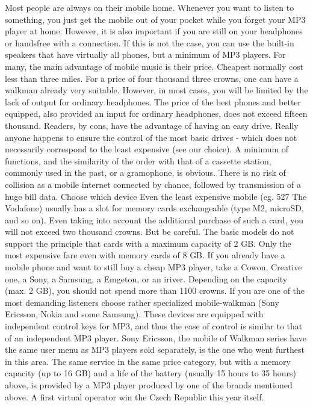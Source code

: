 Most people are always on their mobile home.
Whenever you want to listen to something, you just get the mobile out of your pocket while you forget your MP3 player at home.
However, it is also important if you are still on your headphones or handsfree with a connection.
If this is not the case, you can use the built-in speakers that have virtually all phones, but a minimum of MP3 players.
For many, the main advantage of mobile music is their price.
Cheapest normally cost less than three miles.
For a price of four thousand three crowns, one can have a walkman already very suitable.
However, in most cases, you will be limited by the lack of output for ordinary headphones.
The price of the best phones and better equipped, also provided an input for ordinary headphones, does not exceed fifteen thousand.
Readers, by cons, have the advantage of having an easy drive.
Really anyone happens to ensure the control of the most basic drives - which does not necessarily correspond to the least expensive (see our choice).
A minimum of functions, and the similarity of the order with that of a cassette station, commonly used in the past, or a gramophone, is obvious.
There is no risk of collision as a mobile internet connected by chance, followed by transmission of a huge bill data.
Choose which device
Even the least expensive mobile (eg. 527 The Vodafone) usually has a slot for memory cards exchangeable (type M2, microSD, and so on).
Even taking into account the additional purchase of such a card, you will not exceed two thousand crowns.
But be careful.
The basic models do not support the principle that cards with a maximum capacity of 2 GB.
Only the most expensive fare even with memory cards of 8 GB.
If you already have a mobile phone and want to still buy a cheap MP3 player, take a Cowon, Creative one, a Sony, a Samsung, a Emgeton, or an iriver.
Depending on the capacity (max. 2 GB), you should not spend more than 1100 crowns.
If you are one of the most demanding listeners choose rather specialized mobile-walkman (Sony Ericsson, Nokia and some Samsung).
These devices are equipped with independent control keys for MP3, and thus the ease of control is similar to that of an independent MP3 player.
Sony Ericsson, the mobile of Walkman series have the same user menu as MP3 players sold separately, is the one who went furthest in this area.
The same service in the same price category, but with a memory capacity (up to 16 GB) and a life of the battery (usually 15 hours to 35 hours) above, is provided by a MP3 player produced by one of the brands mentioned above.
A first virtual operator win the Czech Republic this year itself.

